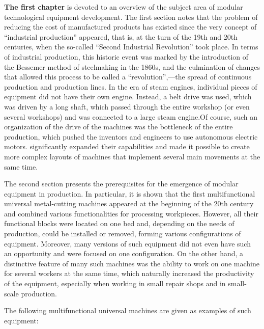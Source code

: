 \textbf{The first chapter} is devoted to an overview of the subject area of modular technological equipment development.
The first section notes that the problem of reducing the cost of manufactured products has existed since the very concept of ``industrial production'' appeared, that is, at the turn of the 19th and 20th centuries, when the so-called ``Second Industrial Revolution'' took place. In terms of industrial production, this historic event was marked by the introduction of the Bessemer method of steelmaking in the 1860s, and the culmination of changes that allowed this process to be called a ``revolution'',---the spread of continuous production and production lines. In the era of steam engines, individual pieces of equipment did not have their own engine. Instead, a belt drive was used, which was driven by a long shaft, which passed through the entire workshop (or even several workshops) and was connected to a large steam engine.Of course, such an organization of the drive of the machines was the bottleneck of the entire production, which pushed the inventors and engineers to use autonomous electric motors. significantly expanded their capabilities and made it possible to create more complex layouts of machines that implement several main movements at the same time.

The second section presents the prerequisites for the emergence of modular equipment in production. In particular, it is shown that the first multifunctional universal metal-cutting machines appeared at the beginning of the 20th century and combined various functionalities for processing workpieces. However, all their functional blocks were located on one bed and, depending on the needs of production, could be installed or removed, forming various configurations of equipment. Moreover, many versions of such equipment did not even have such an opportunity and were focused on one configuration. On the other hand, a distinctive feature of many such machines was the ability to work on one machine for several workers at the same time, which naturally increased the productivity of the equipment, especially when working in small repair shops and in small-scale production.

The following multifunctional universal machines are given as examples of such equipment:

